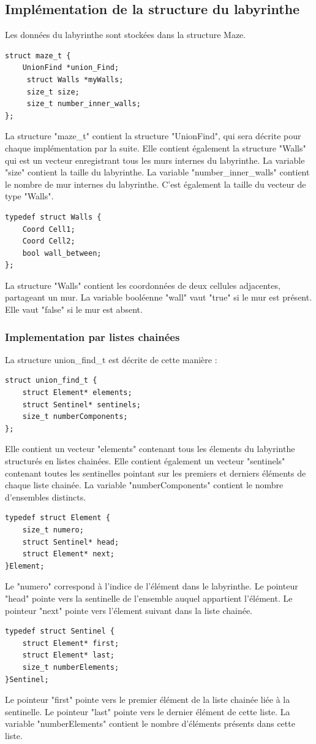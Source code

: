 \documentclass[11pt]{article}
\begin{document}
\subsection{Implémentation de la structure du labyrinthe}
Les données du labyrinthe sont stockées dans la structure Maze.
\begin{lstlisting}[style=CStyle]
struct maze_t {
    UnionFind *union_Find;
     struct Walls *myWalls;
     size_t size;
     size_t number_inner_walls;
};
\end{lstlisting}

La structure "maze\_t" contient la structure "UnionFind", qui sera décrite pour chaque implémentation par la suite. Elle contient également la structure "Walls" qui est un vecteur enregistrant tous les murs internes du labyrinthe. La variable "size" contient la taille du labyrinthe. La variable "number\_inner\_walls" contient le nombre de mur internes du labyrinthe. C'est également la taille du vecteur de type "Walls".
\begin{lstlisting}[style=CStyle]
typedef struct Walls {
    Coord Cell1;
    Coord Cell2;
    bool wall_between;
};
\end{lstlisting}
La structure "Walls" contient les coordonnées de deux cellules adjacentes, partageant un mur. La variable booléenne "wall" vaut "true" si le mur est présent. Elle vaut "false" si le mur est absent.

\subsubsection{Implementation par listes chainées}
La structure union\_find\_t est décrite de cette manière :
\begin{lstlisting}[style=CStyle]
struct union_find_t {
    struct Element* elements;
    struct Sentinel* sentinels;
    size_t numberComponents;
};
\end{lstlisting}
Elle contient un vecteur "elements" contenant tous les élements du labyrinthe structurés en listes chainées. Elle contient également un vecteur "sentinels" contenant toutes les sentinelles pointant sur les premiers et derniers éléments de chaque liste chainée. La variable "numberComponents" contient le nombre d'ensembles distincts.
\begin{lstlisting}[style=CStyle]
typedef struct Element {
    size_t numero;
    struct Sentinel* head;
    struct Element* next;
}Element;
\end{lstlisting}
Le "numero" correspond à l'indice de l'élément dans le labyrinthe. Le pointeur "head" pointe vers la sentinelle de l'ensemble auquel appartient l'élément. Le pointeur "next" pointe vers l'élement suivant dans la liste chainée.
	\begin{lstlisting}[style=CStyle]
typedef struct Sentinel {
    struct Element* first;
    struct Element* last;
    size_t numberElements;
}Sentinel;
\end{lstlisting}
Le pointeur "first" pointe vers le premier élément de la liste chainée liée à la sentinelle. Le pointeur "last" pointe vers le dernier élément de cette liste. La variable "numberElements" contient le nombre d'éléments présents dans cette liste.
\end{document}
